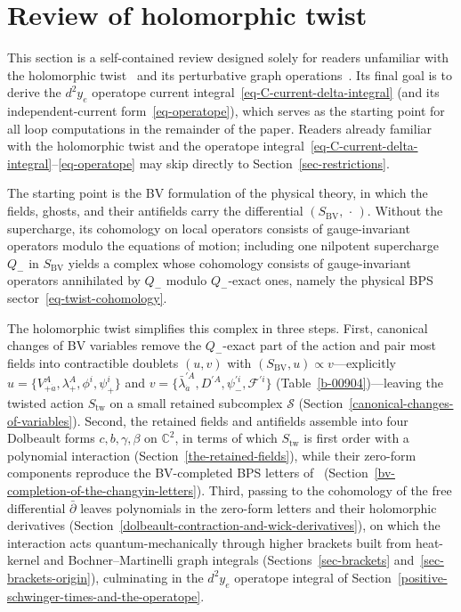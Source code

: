 \documentclass[11pt]{article}
\numberwithin{equation}{section}
\numberwithin{figure}{section}
\numberwithin{table}{section}
\begin{document}
\section{Review of holomorphic twist}\label{sec-BV}

This section is a self-contained review designed solely for readers unfamiliar with the holomorphic twist~\cite{semichiral,BK} and its perturbative graph operations~\cite{Costello,Wang,operatope,higher}. Its final goal is to derive the $d^2y_e$ operatope current integral~\eqref{eq-C-current-delta-integral} (and its independent-current form~\eqref{eq-operatope}), which serves as the starting point for all loop computations in the remainder of the paper. Readers already familiar with the holomorphic twist and the operatope integral~\eqref{eq-C-current-delta-integral}--\eqref{eq-operatope} may skip directly to Section~\ref{sec-restrictions}.

The starting point is the BV formulation of the physical theory, in which the fields, ghosts, and their antifields carry the differential $(S_{\mathrm{BV}},\,\cdot\,)$. Without the supercharge, its cohomology on local operators consists of gauge-invariant operators modulo the equations of motion; including one nilpotent supercharge $Q_-$ in $S_{\mathrm{BV}}$ yields a complex whose cohomology consists of gauge-invariant operators annihilated by $Q_-$ modulo $Q_-$-exact ones, namely the physical BPS sector~\eqref{eq-twist-cohomology}.

The holomorphic twist simplifies this complex in three steps. First, canonical changes of BV variables remove the $Q_-$-exact part of the action and pair most fields into contractible doublets $(u,v)$ with $(S_{\mathrm{BV}},u)\propto v$---explicitly $u=\{V_{+\dot a}^A,\lambda_+^A,\phi^i,\psi_+^i\}$ and $v=\{\bar\lambda_{\dot a}^{\prime A},D^{\prime A},\psi_-^{\prime i},\mathcal F^{\prime i}\}$ (Table~\ref{b-00904})---leaving the twisted action $S_{\mathrm{tw}}$ on a small retained subcomplex $\mathcal S$ (Section~\ref{canonical-changes-of-variables}). Second, the retained fields and antifields assemble into four Dolbeault forms $c,b,\gamma,\beta$ on $\mathbb C^2$, in terms of which $S_{\mathrm{tw}}$ is first order with a polynomial interaction (Section~\ref{the-retained-fields}), while their zero-form components reproduce the BV-completed BPS letters of~\cite{ChangYin} (Section~\ref{bv-completion-of-the-changyin-letters}). Third, passing to the cohomology of the free differential $\bar\partial$ leaves polynomials in the zero-form letters and their holomorphic derivatives (Section~\ref{dolbeault-contraction-and-wick-derivatives}), on which the interaction acts quantum-mechanically through higher brackets built from heat-kernel and Bochner--Martinelli graph integrals (Sections~\ref{sec-brackets} and~\ref{sec-brackets-origin}), culminating in the $d^2y_e$ operatope integral of Section~\ref{positive-schwinger-times-and-the-operatope}.
\end{document}
